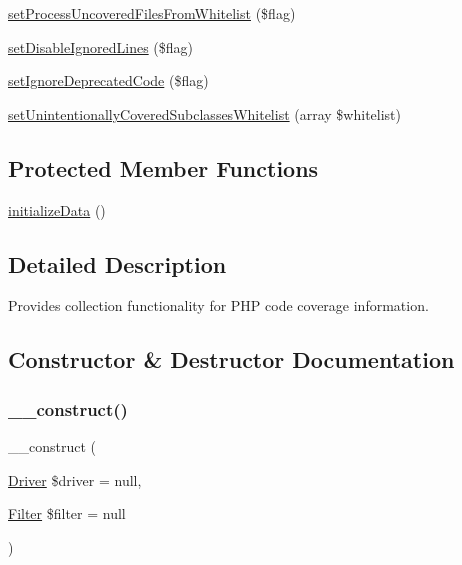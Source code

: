 \begin{DoxyCompactItemize}
\item 
\mbox{\hyperlink{class_sebastian_bergmann_1_1_code_coverage_1_1_code_coverage_ae74f3c174591e178c96db3c38b215f4e}{set\+Process\+Uncovered\+Files\+From\+Whitelist}} (\$flag)
\item 
\mbox{\hyperlink{class_sebastian_bergmann_1_1_code_coverage_1_1_code_coverage_a8152f4cd4000263cb825a676467f73fc}{set\+Disable\+Ignored\+Lines}} (\$flag)
\item 
\mbox{\hyperlink{class_sebastian_bergmann_1_1_code_coverage_1_1_code_coverage_ae3320d14992a14b02988637c2ec551d6}{set\+Ignore\+Deprecated\+Code}} (\$flag)
\item 
\mbox{\hyperlink{class_sebastian_bergmann_1_1_code_coverage_1_1_code_coverage_a80819a1fdf997603911030134fd11eba}{set\+Unintentionally\+Covered\+Subclasses\+Whitelist}} (array \$whitelist)
\end{DoxyCompactItemize}
\subsection*{Protected Member Functions}
\begin{DoxyCompactItemize}
\item 
\mbox{\hyperlink{class_sebastian_bergmann_1_1_code_coverage_1_1_code_coverage_a8e1839f9e7441ef2a15a3f5ca8fa6f8e}{initialize\+Data}} ()
\end{DoxyCompactItemize}


\subsection{Detailed Description}
Provides collection functionality for P\+HP code coverage information. 

\subsection{Constructor \& Destructor Documentation}
\mbox{\label{class_sebastian_bergmann_1_1_code_coverage_1_1_code_coverage_a94e4e6474f7c4fbff9031fd4fcb1b474}} 
\subsubsection{\texorpdfstring{\+\_\+\+\_\+construct()}{\_\_construct()}}
{\footnotesize\ttfamily \+\_\+\+\_\+construct (\begin{DoxyParamCaption}\item[{\mbox{\hyperlink{interface_sebastian_bergmann_1_1_code_coverage_1_1_driver_1_1_driver}{Driver}}}]{\$driver = {\ttfamily null},  }\item[{\mbox{\hyperlink{class_sebastian_bergmann_1_1_code_coverage_1_1_filter}{Filter}}}]{\$filter = {\ttfamily null} }\end{DoxyParamCaption})}

